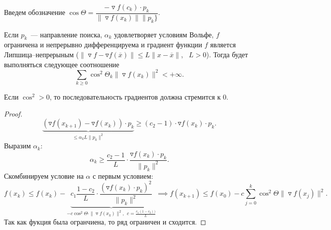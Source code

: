 Введем обозначение $\cos \Theta = \dfrac{-\triangledown f(c_k) \cdot p_k}{\| \triangledown f(x_k) \| \|p_k\}}$.

\begin{theorem}
    Если $p_k$~--- направление поиска, $\alpha_k$ удовлетворяет условиям Вольфе,
    $f$ огра\-ни\-че\-на и непрерывно дифференцируема и градиент функции $f$ является Липшица--непрерыным ($\| \triangledown f - \triangledown f(\overline{x}) \| \leqslant L \| x - \overline{x} \|$, ~$L > 0$). Тогда будет выполняться следующее соотношение 
    \[\sum_{k\geqslant 0} \cos^2 \Theta_k \| \triangledown f(x_k)\|^2 < +\infty. \]
\end{theorem}
\begin{remark}
    Если $\cos^2 > 0$, то последовательность градиентов должна стремится к 0.
\end{remark}
\begin{proof}
    \[\underbrace{\left( \triangledown f(x_{k + 1}) - \triangledown f(x_k) \right) \cdot p_k}_{\leqslant \alpha_k L \| p_k\| ^2} \geqslant (c_2 - 1) \cdot \triangledown f(x_k) \cdot p_k. \]
    Выразим $\alpha_k$:
    \[\alpha_k \geqslant \dfrac{c_2 - 1}{L} \cdot \dfrac{\triangledown f(x_k) \cdot p_k}{\| p_k \|^2}.\]
    Скомбинируем условие на $\alpha$ с первым условием:
    \[f(x_k) \leqslant f(x_k) - \underbrace{c_1 \dfrac{1 - c_2}{L} \cdot \dfrac{\left( \triangledown f(x_k) \cdot p_k \right)^2}{\|p_k \|^2} }_{-c \cos^2 \Theta \cdot \| \triangledown f(x_k) \| ^2, ~~c = \frac{c_1 (1 - c_2))}{L}}
    \implies
    f(x_{k+1}) \leqslant f(x_0) - c \sum_{j = 0}^k \cos^2 \Theta \| \triangledown f(x_j) \|^2.\]
    Так как фукция была огранчиена, то ряд ограничен и сходится.
\end{proof}

